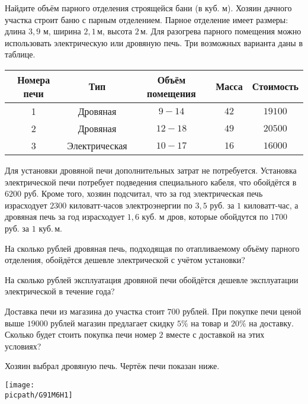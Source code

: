 \begin{homework}[number=1]
	\begin{listofex}
		\item Найдите объём парного отделения строящейся бани (в куб. м).
		Хозяин дачного участка строит баню с парным отделением. Парное отделение имеет размеры: длина \( 3,9  \) м, ширина \( 2,1 \) м, высота \( 2 \) м. Для разогрева парного помещения можно использовать электрическую или дровяную печь. Три возможных варианта даны в таблице.
		\begin{center}
			\footnotesize
			\begin{tabular}{|c|c|c|c|c|}
				\hline
				\rowcolor{gray}\textbf{Номера печи}&\textbf{Тип}&\textbf{Объём помещения}&\textbf{Масса}&\textbf{Стоимость}\\
				\hline
				1&Дровяная&\( 9-14 \)&\( 42 \)&\( 19 100 \)\\
				\hline
				2&Дровяная&\( 12-18 \)&\( 49 \)&\( 20 500 \)\\
				\hline
				3&Электрическая&\( 10-17 \)&\( 16 \)&\( 16 000 \)\\
				\hline
			\end{tabular}
		\end{center}
		Для установки дровяной печи дополнительных затрат не потребуется. Установка электрической печи потребует подведения специального кабеля, что обойдётся в \( 6200 \) руб. Кроме того, хозяин подсчитал, что за год электрическая печь израсходует \( 2300 \) киловатт-часов электроэнергии по \( 3,5 \) руб. за \( 1 \) киловатт-час, а дровяная печь за год израсходует \( 1,6 \) куб. м дров, которые обойдутся по \( 1700 \) руб. за \( 1 \) куб. м.
		\item На сколько рублей дровяная печь, подходящая по отапливаемому объёму парного отделения, обойдётся дешевле электрической с учётом установки?
		\item На сколько рублей эксплуатация дровяной печи обойдётся дешевле эксплуатации электрической в течение года?
		\item Доставка печи из магазина до участка стоит \( 700 \) рублей. При покупке печи ценой выше \( 19 000 \) рублей магазин предлагает скидку \( 5\% \) на товар и \( 20\% \) на доставку. Сколько будет стоить покупка печи номер \( 2 \) вместе с доставкой на этих условиях?
		\item Хозяин выбрал дровяную печь. Чертёж печи показан ниже.
		\begin{minipage}[c]{0.2\textwidth}
			\texttt{[image: \\picpath/G91M6H1]}

\end{minipage}
\end{listofex}
\end{homework}
